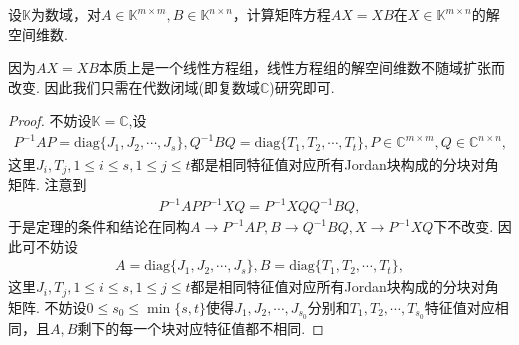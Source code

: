 \documentclass[../../main.tex]{subfiles}
\begin{document}
\begin{theorem}[交结数]\label{theorem:AX-XB相关命题3}
设$\mathbb{K}$为数域，对$A\in\mathbb{K}^{m\times m}, B\in\mathbb{K}^{n\times n}$，计算矩阵方程$AX = XB$在$X\in\mathbb{K}^{m\times n}$的解空间维数.
\end{theorem}
\begin{remark}
因为$AX = XB$本质上是一个线性方程组，线性方程组的解空间维数不随域扩张而改变. 因此我们只需在代数闭域(即复数域$\mathbb{C}$)研究即可.
\end{remark}
\begin{proof}
不妨设$\mathbb{K}=\mathbb{C}$,设
\begin{align*}
P^{-1}AP = \mathrm{diag}\{J_1, J_2, \cdots, J_s\}, Q^{-1}BQ = \mathrm{diag}\{T_1, T_2, \cdots, T_t\}, P\in\mathbb{C}^{m\times m}, Q\in\mathbb{C}^{n\times n},
\end{align*}
这里$J_i, T_j, 1\leqslant i\leqslant s, 1\leqslant j\leqslant t$都是相同特征值对应所有Jordan块构成的分块对角矩阵.
注意到
\begin{align*}
P^{-1}APP^{-1}XQ = P^{-1}XQQ^{-1}BQ,
\end{align*}
于是定理的条件和结论在同构$A\rightarrow P^{-1}AP,B\rightarrow Q^{-1}BQ,X\rightarrow P^{-1}XQ$下不改变. 因此可不妨设
\begin{align*}
A = \mathrm{diag}\{J_1, J_2, \cdots, J_s\}, B = \mathrm{diag}\{T_1, T_2, \cdots, T_t\},
\end{align*}
这里$J_i, T_j, 1\leqslant i\leqslant s, 1\leqslant j\leqslant t$都是相同特征值对应所有Jordan块构成的分块对角矩阵. 不妨设$0\leqslant s_0\leqslant\min\{s, t\}$使得$J_1, J_2, \cdots, J_{s_0}$分别和$T_1, T_2, \cdots, T_{s_0}$特征值对应相同，且$A, B$剩下的每一个块对应特征值都不相同.


\end{proof}
\end{document}
